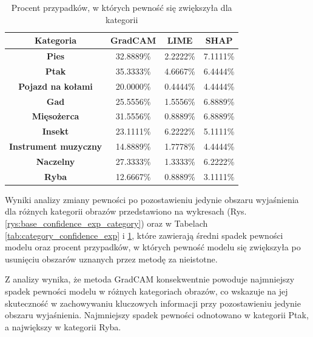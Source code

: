 \begin{table}[h]
	\centering
	\begin{tabular}{|c|c|c|c|}
		\hline
		\textbf{Kategoria}           & \textbf{GradCAM} & \textbf{LIME} & \textbf{SHAP} \\
		\hline
		\textbf{Pies}                & 32.8889\%        & 2.2222\%      & 7.1111\%      \\
		\hline
		\textbf{Ptak}                & 35.3333\%        & 4.6667\%      & 6.4444\%      \\
		\hline
		\textbf{Pojazd na kołami}    & 20.0000\%        & 0.4444\%      & 4.4444\%      \\
		\hline
		\textbf{Gad}                 & 25.5556\%        & 1.5556\%      & 6.8889\%      \\
		\hline
		\textbf{Mięsożerca}          & 31.5556\%        & 0.8889\%      & 6.8889\%      \\
		\hline
		\textbf{Insekt}              & 23.1111\%        & 6.2222\%      & 5.1111\%      \\
		\hline
		\textbf{Instrument muzyczny} & 14.8889\%        & 1.7778\%      & 4.4444\%      \\
		\hline
		\textbf{Naczelny}            & 27.3333\%        & 1.3333\%      & 6.2222\%      \\
		\hline
		\textbf{Ryba}                & 12.6667\%        & 0.8889\%      & 3.1111\%      \\
		\hline
	\end{tabular}
	\caption{Procent przypadków, w których pewność się zwiększyła dla kategorii}
	\label{tab:category_confidence_exp_percent}
\end{table}

Wyniki analizy zmiany pewności po pozostawieniu jedynie obszaru wyjaśnienia dla różnych kategorii obrazów przedstawiono na wykresach (Rys. \ref{rys:base_confidence_exp_category}) oraz w Tabelach \ref{tab:category_confidence_exp} i \ref{tab:category_confidence_exp_percent}, które zawierają średni spadek pewności modelu oraz procent przypadków, w których pewność modelu się zwiększyła po usunięciu obszarów uznanych przez metodę za nieistotne.

Z analizy wynika, że metoda GradCAM konsekwentnie powoduje najmniejszy spadek pewności modelu w różnych kategoriach obrazów, co wskazuje na jej skuteczność w zachowywaniu kluczowych informacji przy pozostawieniu jedynie obszaru wyjaśnienia.
Najmniejszy spadek pewności odnotowano w kategorii Ptak, a największy w kategorii Ryba.

